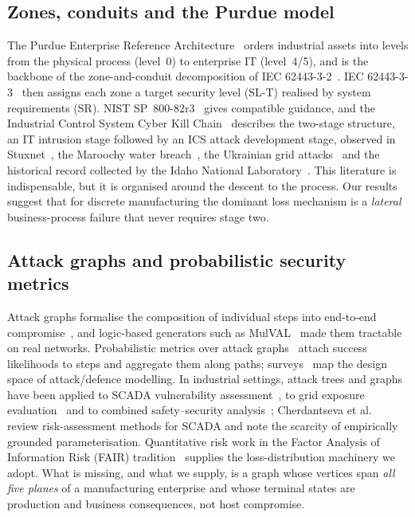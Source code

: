 \subsection{Zones, conduits and the Purdue model}

The Purdue Enterprise Reference Architecture~\cite{williams1994purdue} orders
industrial assets into levels from the physical process (level~0) to enterprise
IT (level~4/5), and is the backbone of the zone-and-conduit decomposition of
IEC 62443-3-2~\cite{iec624433302020}. IEC 62443-3-3~\cite{iec624433303} then
assigns each zone a target security level (SL-T) realised by system
requirements (SR). NIST SP~800-82r3~\cite{nist80082r3} gives compatible
guidance, and the Industrial Control System Cyber Kill
Chain~\cite{assante2015killchain} describes the two-stage structure, an IT
intrusion stage followed by an ICS attack development stage, observed in
Stuxnet~\cite{langner2011stuxnet}, the Maroochy water
breach~\cite{slay2007maroochy}, the Ukrainian grid
attacks~\cite{eisac2016ukraine} and the historical record collected by the Idaho National
Laboratory~\cite{inl2018history}. This literature is indispensable, but it is
organised around the descent to the process. Our results suggest that for
discrete manufacturing the dominant loss mechanism is a \emph{lateral}
business-process failure that never requires stage two.

\subsection{Attack graphs and probabilistic security metrics}

Attack graphs formalise the composition of individual steps into end-to-end
compromise~\cite{phillips1998graph,sheyner2002automated}, and logic-based
generators such as MulVAL~\cite{ou2005mulval} made them tractable on real
networks. Probabilistic metrics over attack graphs~\cite{wang2008attack}
attach success likelihoods to steps and aggregate them along paths;
surveys~\cite{kordy2014dag,lallie2020review,zenitani2023attack} map the design
space of attack/defence modelling. In industrial settings, attack trees and
graphs have been applied to SCADA vulnerability
assessment~\cite{byres2004attack,ten2008vulnerability}, to grid exposure
evaluation~\cite{hahn2011cyber} and to combined safety--security
analysis~\cite{kriaa2015survey}; Cherdantseva et al.~\cite{cherdantseva2016review}
review risk-assessment methods for SCADA and note the scarcity of empirically
grounded parameterisation. Quantitative risk work in the Factor Analysis of Information Risk (FAIR)
tradition~\cite{freund2014fair,hubbard2016measure} supplies the
loss-distribution machinery we adopt. What is missing, and what we supply, is a
graph whose vertices span \emph{all five planes} of a manufacturing enterprise
and whose terminal states are production and business consequences, not host
compromise.

